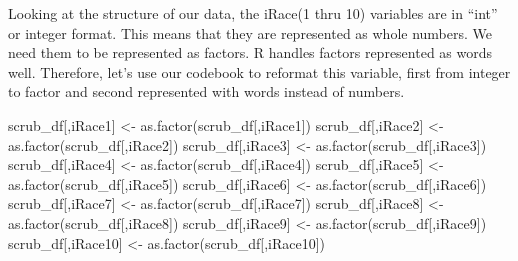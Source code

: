 \documentclass[
  english,
]{book}
\newenvironment{Shaded}{\begin{snugshade}}{\end{snugshade}}
\newcommand{\FunctionTok}[1]{\textcolor[rgb]{0.00,0.00,0.00}{#1}}
\newcommand{\NormalTok}[1]{#1}
\newcommand{\OtherTok}[1]{\textcolor[rgb]{0.56,0.35,0.01}{#1}}
\newcommand{\StringTok}[1]{\textcolor[rgb]{0.31,0.60,0.02}{#1}}
\begin{document}
Looking at the structure of our data, the iRace(1 thru 10) variables are in ``int'' or integer format. This means that they are represented as whole numbers. We need them to be represented as factors. R handles factors represented as words well. Therefore, let's use our codebook to reformat this variable, first from integer to factor and second represented with words instead of numbers.

\begin{Shaded}
\begin{Highlighting}[]
\NormalTok{scrub\_df[,}\StringTok{\textquotesingle{}iRace1\textquotesingle{}}\NormalTok{] }\OtherTok{\textless{}{-}} \FunctionTok{as.factor}\NormalTok{(scrub\_df[,}\StringTok{\textquotesingle{}iRace1\textquotesingle{}}\NormalTok{])}
\NormalTok{scrub\_df[,}\StringTok{\textquotesingle{}iRace2\textquotesingle{}}\NormalTok{] }\OtherTok{\textless{}{-}} \FunctionTok{as.factor}\NormalTok{(scrub\_df[,}\StringTok{\textquotesingle{}iRace2\textquotesingle{}}\NormalTok{])}
\NormalTok{scrub\_df[,}\StringTok{\textquotesingle{}iRace3\textquotesingle{}}\NormalTok{] }\OtherTok{\textless{}{-}} \FunctionTok{as.factor}\NormalTok{(scrub\_df[,}\StringTok{\textquotesingle{}iRace3\textquotesingle{}}\NormalTok{])}
\NormalTok{scrub\_df[,}\StringTok{\textquotesingle{}iRace4\textquotesingle{}}\NormalTok{] }\OtherTok{\textless{}{-}} \FunctionTok{as.factor}\NormalTok{(scrub\_df[,}\StringTok{\textquotesingle{}iRace4\textquotesingle{}}\NormalTok{])}
\NormalTok{scrub\_df[,}\StringTok{\textquotesingle{}iRace5\textquotesingle{}}\NormalTok{] }\OtherTok{\textless{}{-}} \FunctionTok{as.factor}\NormalTok{(scrub\_df[,}\StringTok{\textquotesingle{}iRace5\textquotesingle{}}\NormalTok{])}
\NormalTok{scrub\_df[,}\StringTok{\textquotesingle{}iRace6\textquotesingle{}}\NormalTok{] }\OtherTok{\textless{}{-}} \FunctionTok{as.factor}\NormalTok{(scrub\_df[,}\StringTok{\textquotesingle{}iRace6\textquotesingle{}}\NormalTok{])}
\NormalTok{scrub\_df[,}\StringTok{\textquotesingle{}iRace7\textquotesingle{}}\NormalTok{] }\OtherTok{\textless{}{-}} \FunctionTok{as.factor}\NormalTok{(scrub\_df[,}\StringTok{\textquotesingle{}iRace7\textquotesingle{}}\NormalTok{])}
\NormalTok{scrub\_df[,}\StringTok{\textquotesingle{}iRace8\textquotesingle{}}\NormalTok{] }\OtherTok{\textless{}{-}} \FunctionTok{as.factor}\NormalTok{(scrub\_df[,}\StringTok{\textquotesingle{}iRace8\textquotesingle{}}\NormalTok{])}
\NormalTok{scrub\_df[,}\StringTok{\textquotesingle{}iRace9\textquotesingle{}}\NormalTok{] }\OtherTok{\textless{}{-}} \FunctionTok{as.factor}\NormalTok{(scrub\_df[,}\StringTok{\textquotesingle{}iRace9\textquotesingle{}}\NormalTok{])}
\NormalTok{scrub\_df[,}\StringTok{\textquotesingle{}iRace10\textquotesingle{}}\NormalTok{] }\OtherTok{\textless{}{-}} \FunctionTok{as.factor}\NormalTok{(scrub\_df[,}\StringTok{\textquotesingle{}iRace10\textquotesingle{}}\NormalTok{])}
\end{Highlighting}
\end{Shaded}
\end{document}
